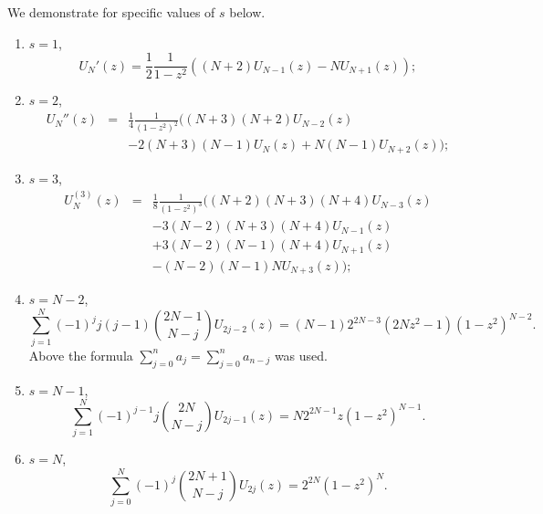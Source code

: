 \documentclass[12pt]{article}
\newcommand{\pa}[1]{\left(#1\right)}
\begin{document}
We demonstrate for specific values of $s$ below.
\begin{enumerate}
\item $s = 1$,
\begin{displaymath}
U_N'(z) = \frac{1}{2}\frac{1}{1 - z^2}\pa{(N + 2)U_{N - 1}(z) - NU_{N + 1}(z)};
\end{displaymath}

\item $s = 2$,
\begin{eqnarray*}
U_N''(z) &=& \frac{1}{4}\frac{1}{(1 - z^2)^2}\Big((N + 3)(N + 2)U_{N - 2}(z) \\
& & - 2(N + 3)(N - 1)U_N(z) + N(N - 1)U_{N + 2}(z)\Big);
\end{eqnarray*}

\item $s = 3$,
\begin{eqnarray*}
U_N^{(3)}(z) &=& \frac{1}{8}\frac{1}{(1 - z^2)^3}\Big((N + 2)(N + 3)(N + 4)U_{N - 3}(z) \\
& & - 3(N - 2)(N + 3)(N + 4)U_{N - 1}(z) \\
& & + 3(N - 2)(N - 1)(N + 4)U_{N + 1}(z) \\
& & - (N - 2)(N - 1)NU_{N + 3}(z)\Big);
\end{eqnarray*}



\item $s = N-2$,
$$
\sum_{j = 1}^{N}(-1)^j j(j - 1){2N-1\choose N-j} U_{2j - 2}(z) = (N-1)2^{2N-3}(2Nz^2-1)(1-z^2)^{N-2}.
$$
Above the formula $\displaystyle\sum_{j=0}^n a_j=\sum_{j=0}^n a_{n-j}$ was used. 

\item $s = N-1$,
$$
\sum_{j = 1}^{N}(-1)^{j - 1} j{2N\choose N-j} U_{2j - 1}(z) = N2^{2N-1}z(1-z^2)^{N-1}.
$$

\item $s = N$,
\begin{displaymath}
\sum_{j = 0}^{N} (-1)^j{2N+1\choose N-j}U_{2j}(z) = 2^{2N}(1 - z^2)^N.
\end{displaymath}

\end{enumerate}
\end{document}
